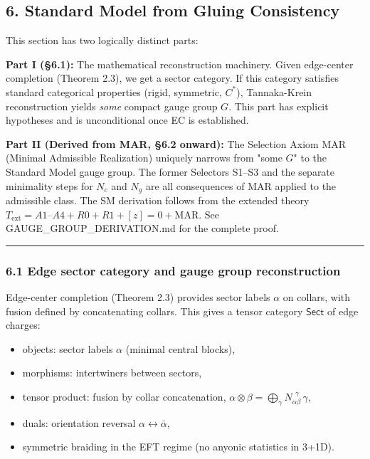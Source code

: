 \subsection{6. Standard Model from Gluing Consistency}\label{6-standard-model-from-gluing-consistency}

This section has two logically distinct parts:

\textbf{Part I (§6.1):} The mathematical reconstruction machinery. Given edge-center completion (Theorem 2.3), we get a sector category. If this category satisfies standard categorical properties (rigid, symmetric, \(C^*\)), Tannaka-Krein reconstruction yields \emph{some} compact gauge group \(G\). This part has explicit hypotheses and is unconditional once EC is established.

\textbf{Part II (Derived from MAR, §6.2 onward):} The Selection Axiom MAR (Minimal Admissible Realization) uniquely narrows from "some \(G\)" to the Standard Model gauge group. The former Selectors S1--S3 and the separate minimality steps for \(N_c\) and \(N_g\) are all consequences of MAR applied to the admissible class. The SM derivation follows from the extended theory \(T_{\mathrm{ext}} = A1\text{–}A4 + R0 + R1 + [z]=0 + \mathrm{MAR}\). See GAUGE\_GROUP\_DERIVATION.md for the complete proof.

\begin{center}\rule{0.5\linewidth}{0.5pt}\end{center}

\subsubsection{6.1 Edge sector category and gauge group reconstruction}\label{61-edge-sector-category-and-gauge-group-reconstruction}

Edge-center completion (Theorem 2.3) provides sector labels \(\alpha\) on collars, with fusion defined by concatenating collars. This gives a tensor category \(\mathsf{Sect}\) of edge charges:

\begin{itemize}
\tightlist
\item
  objects: sector labels \(\alpha\) (minimal central blocks),
\item
  morphisms: intertwiners between sectors,
\item
  tensor product: fusion by collar concatenation, \(\alpha \otimes \beta = \bigoplus_\gamma N_{\alpha\beta}^{\ \ \gamma}\,\gamma\),
\item
  duals: orientation reversal \(\alpha \leftrightarrow \bar\alpha\),
\item
  symmetric braiding in the EFT regime (no anyonic statistics in 3+1D).
\end{itemize}

